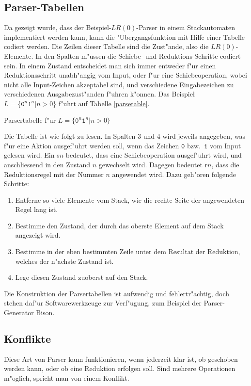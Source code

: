 \subsection{Parser-Tabellen}
Da gezeigt wurde, dass der Beispiel-$LR(0)$-Parser in einem Stackautomaten
implementiert werden kann, kann die "Ubergangsfunktion mit Hilfe
einer Tabelle codiert werden. Die Zeilen dieser Tabelle sind die
Zust"ande, also die $LR(0)$-Elemente. In den Spalten m"ussen die
Schiebe- und Reduktions-Schritte codiert sein. In einem Zustand
entscheidet man sich immer entweder f"ur einen Reduktionsschritt
unabh"angig vom Input, oder f"ur eine Schiebeoperation, wobei
nicht alle Input-Zeichen akzeptabel sind, und verschiedene Eingabezeichen
zu verschiedenen Ausgabezust"anden f"uhren k"onnen. Das Beispiel
$L=\{\texttt{0}^n\texttt{1}^n|n>0\}$ f"uhrt auf Tabelle \ref{parsetable}.
\begin{table}[H]

\caption{Parsertabelle f"ur $L=\{\texttt{0}^n\texttt{1}^n|n>0\}$\label{parsetable}}
\end{table}
Die Tabelle ist wie folgt zu lesen. In Spalten 3 und 4 wird jeweils
angegeben, was f"ur eine Aktion ausgef"uhrt werden soll, wenn das
Zeichen $\texttt{0}$ bzw.~$\texttt{1}$ vom Input gelesen wird. Ein s$n$ bedeutet, dass
eine Schiebeoperation ausgef"uhrt wird, und anschliessend in den
Zustand $n$ gewechselt wird. Dagegen bedeutet r$n$,
dass die Reduktionsregel mit der Nummer $n$ angewendet wird.
Dazu geh"oren folgende Schritte:
\begin{enumerate}
\item
Entferne so viele Elemente vom Stack, wie die rechte Seite der angewendeten
Regel lang ist.
\item
Bestimme den Zustand, der durch das oberste Element auf dem Stack
angezeigt wird.
\item
Bestimme in der eben bestimmten Zeile unter dem Resultat der Reduktion,
welches der n"achste Zustand ist.
\item
Lege diesen Zustand zuoberst auf den Stack.
\end{enumerate}
Die Konstruktion der Parsertabellen ist aufwendig und fehlertr"achtig,
doch stehen daf"ur Softwarewerkzeuge zur Verf"ugung, zum Beispiel
der Parser-Generator Bison.

\subsection{Konflikte}
Diese Art von Parser kann funktionieren, wenn jederzeit klar ist, ob
geschoben werden kann, oder ob eine Reduktion erfolgen soll.
Sind mehrere Operationen m"oglich, spricht man von einem Konflikt.
